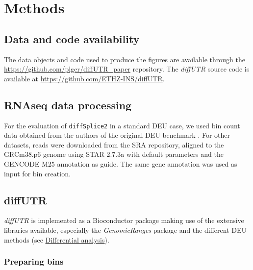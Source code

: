 \documentclass{bmcart}
\begin{document}
\section*{Methods}

\subsection{Data and code availability}
The data objects and code used to produce the figures are available through the \url{https://github.com/plger/diffUTR_paper} repository. The \textit{diffUTR} source code is available at \url{https://github.com/ETHZ-INS/diffUTR}.

\subsection{RNAseq data processing}

For the evaluation of \texttt{diffSplice2} in a standard DEU case, we used bin count data obtained from the authors of the original DEU benchmark \cite{Soneson2016IsoformUsage}. For other datasets, reads were downloaded from the SRA repository, aligned to the GRCm38.p6 genome using STAR 2.7.3a with default parameters and the GENCODE M25 annotation as guide. The same gene annotation was used as input for bin creation.

\subsection{diffUTR}

\textit{diffUTR} is implemented as a Bioconductor package making use of the extensive libraries available, especially the \textit{GenomicRanges} package \cite{Lawrence2013SoftwareRanges} and the different DEU methods (see \hyperref[sec:DE]{Differential analysis}).

\subsubsection{Preparing bins}
\label{sec:bins}
\end{document}
